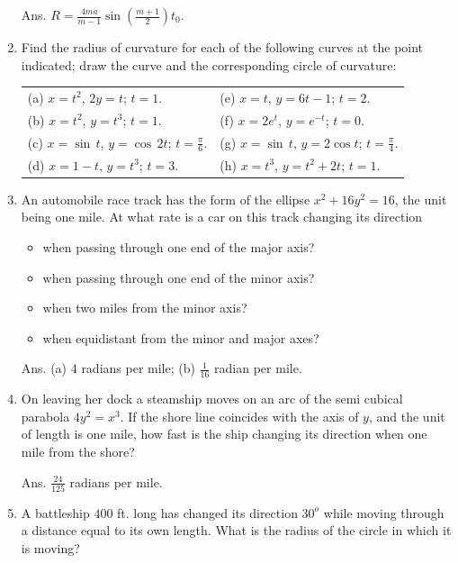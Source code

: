 \begin{enumerate}
Ans. $R = \frac{4 ma}{m - 1} \sin \left( \frac{m + 1}{2} \right) t_0$.

\item
Find the radius of curvature for each of the following curves 
at the point indicated; draw the curve and the corresponding 
circle of curvature:

\begin{tabular}{ll}
(a) $x = t^2$, $2y = t$; $t = 1$. &	
(e) $x = t$, $y = 6t - 1$; $t = 2$.\\
(b) $x = t^2$, $y = t^3$; $t = 1$. &	
(f) $x = 2e^t$, $y = e^{-t}$; $t = 0$.\\
(c) $x = \sin\, t$, $y = \cos\, 2t$; $t= \frac{\pi}{6}$. &
(g) $x = \sin\, t$, $y = 2 \cos t$; $t = \frac{\pi}{4}$.\\
(d) $x = 1 - t$, $y = t^3$; $t = 3$. &
(h) $x = t^3$, $y = t^2 + 2t$; $t = 1$.\\
\end{tabular}

\item
An automobile race track has the form of the ellipse 
$x^2 + 16y^2 = 16$, the unit being one mile. At what rate 
is a car on this track changing its direction

\begin{itemize}
\item[(a)] 
when passing through one end of the major axis?

\item[(b)] 
when passing through one end of the minor axis?

\item[(c)] 
when two miles from the minor axis?

\item[(d)] 
when equidistant from the minor and major axes?
\end{itemize}

Ans. (a) $4$ radians per mile; (b) $\frac{1}{16}$ radian per mile.

\item
On leaving her dock a steamship moves on an arc of the 
semi cubical parabola $4y^2 = x^3$. If the shore line coincides with 
the axis of $y$, and the unit of length is one mile, how fast 
is the ship changing its direction when one mile from the shore?

Ans. $\frac{24}{125}$ radians per mile.

\item
A battleship $400$ ft. long has changed its direction $30^o$ 
while moving through a distance equal to its own length. What is 
the radius of the circle in which it is moving?


\end{enumerate}
